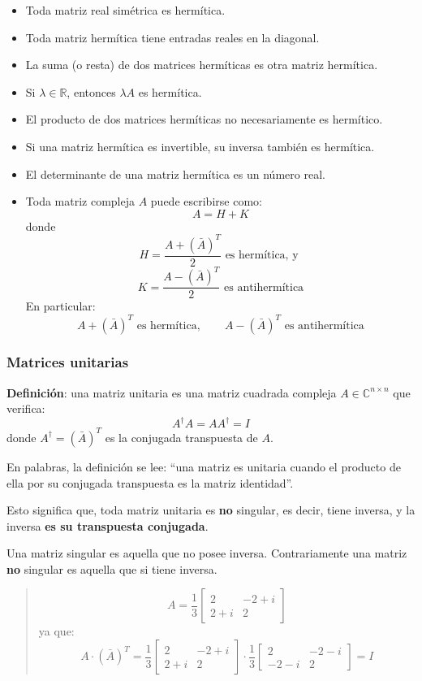 \begin{itemize}
  \item Toda matriz real simétrica es hermítica.
  \item Toda matriz hermítica tiene entradas reales en la diagonal.
  \item La suma (o resta) de dos matrices hermíticas es otra matriz hermítica.
  \item Si \(\lambda \in \mathbb{R}\), entonces \(\lambda A\) es hermítica.
  \item El producto de dos matrices hermíticas no necesariamente es hermítico.
  \item Si una matriz hermítica es invertible, su inversa también es hermítica.
  \item El determinante de una matriz hermítica es un número real.
  \item Toda matriz compleja \(A\) puede escribirse como:
  \[
  A = H + K
  \]
  donde
  \[
  H = \frac{A + (\bar{A})^T}{2} \text{ es hermítica, y }
  \]
  \[
  K = \frac{A - (\bar{A})^T}{2} \text{ es antihermítica}
  \]
  En particular:
  \[
  A + (\bar{A})^T \text{ es hermítica}, \qquad A - (\bar{A})^T \text{ es antihermítica}
  \]
\end{itemize}

\subsubsection{Matrices unitarias}

\textbf{Definición}: una matriz unitaria es una matriz cuadrada compleja \(A \in \mathbb{C}^{n \times n}\) que verifica:
\[
A^\dagger A = A A^\dagger = I
\]
donde \(A^\dagger = (\bar{A})^T\) es la conjugada transpuesta de \(A\).

En palabras, la definición se lee: ``una matriz es unitaria cuando el producto de ella por su conjugada transpuesta es la matriz identidad''.

Esto significa que, toda matriz unitaria es \textbf{no} singular, es decir, tiene inversa, y la inversa \textbf{es su transpuesta conjugada}. 

\begin{tcolorbox}[remember, title=Recordatorio]
  Una matriz singular es aquella que no posee inversa. Contrariamente una matriz \textbf{no} singular es aquella que si tiene inversa.
\end{tcolorbox}

\begin{quote}
  \[
    A = \frac{1}{3} \begin{bmatrix}
      2 & -2+i \\
      2+i & 2
    \end{bmatrix}
  \]
  ya que:
  \[
  A \cdot (\bar{A})^T = \frac{1}{3} \begin{bmatrix}
      2 & -2+i \\
      2+i & 2
    \end{bmatrix} \cdot \frac{1}{3} \begin{bmatrix}
      2 & -2-i \\
      -2-i & 2
    \end{bmatrix} = I
  \]
\end{quote}

